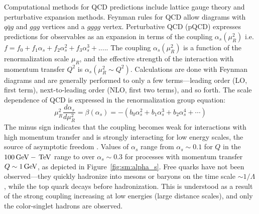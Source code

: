 Computational methods for QCD predictions include lattice gauge theory and perturbative expansion methods. Feynman rules for QCD allow diagrams with $q\bar{q}g$ and $ggg$ vertices and a $gggg$ vertex\cite{Ellis:1991qj}. Perturbative QCD (pQCD) expresses predictions for observables as an expansion in terms of the coupling $\alpha_s(\mu_R^2)$ i.e. $f = f_0 + f_1\alpha_s + f_2\alpha_s^2 + f_3\alpha_s^3 +....$. The coupling $\alpha_s(\mu_R^2)$ is a function of the renormalization scale $\mu_R$, and the effective strength of the interaction with momentum transfer $Q^2$ is $\alpha_s(\mu_R^2 \sim Q^2)$. Calculations are done with Feynman diagrams and are generally performed to only a few terms---leading order (LO, first term), next-to-leading order (NLO, first two terms), and so forth.
The scale dependence of QCD is expressed in the renormalization group equation:
\begin{equation}
    \mu^2_R\frac{d\alpha_s}{d\mu_R^2} = \beta(\alpha_s) = -(b_0 \alpha_s^2 + b_1 \alpha_s^3 + b_2 \alpha_s^4 + \cdots)
    \label{eq:renormalization_group}
\end{equation}
The minus sign indicates that the coupling becomes weak for interactions with high momentum transfer and is strongly interacting for low energy scales, the source of asymptotic freedom \cite{PhysRevLett.30.1346, PhysRevLett.30.1343}. Values of $\alpha_s$ range from $\alpha_s \sim 0.1$ for $Q$ in the $100 \,\text{Ge\hspace{-.08em}V} - \,\text{Te\hspace{-.08em}V}$ range to over $\alpha_s \sim 0.3$ for processes with momentum transfer $Q \sim 1 \,\text{Ge\hspace{-.08em}V}$, as depicted in Figure~\ref{fig:sm:alpha_s}. Free quarks have not been observed---they quickly hadronize into mesons or baryons on the time scale $\sim 1/\Lambda$, while the top quark decays before hadronization. This is understood as a result of the strong coupling increasing at low energies (large distance scales), and only the color-singlet hadrons are observed.
